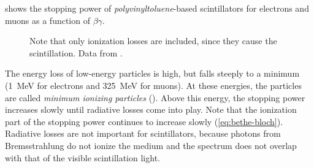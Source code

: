  shows the stopping power of
\emph{polyvinyltoluene}-based scintillators for electrons and muons as a
function of $\beta\gamma$.
\begin{figure}
\centering

\caption{  Note that only ionization losses are
included, since they cause the scintillation.  Data from
\cites{ESTAR}{AtomicNuclearProperties}.}
\label{fig:stoppingpower}
\end{figure}
The energy loss of low-energy particles is high, but falls steeply to a
minimum (\SI{1}{\mega\electronvolt} for electrons and
\SI{325}{\mega\electronvolt} for muons).  At these energies, the particles are
called \emph{minimum ionizing particles} (\mip).  Above this energy, the
stopping power increases slowly until radiative losses come into play.  Note
that the ionization part of the stopping power continues to increase slowly
(\eqref{eq:bethe-bloch}).
Radiative losses are not important for scintillators, because photons from
Bremsstrahlung do not ionize the medium and the spectrum does not
overlap with that of the visible
scintillation light.

